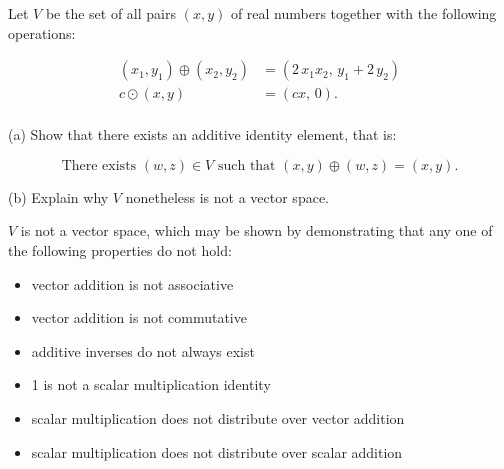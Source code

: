 
\begin{exerciseStatement}


 Let \(V\) be the set of all pairs \((x,y)\) of real numbers together with the following operations: 


\begin{align*} (x_1,y_1)\oplus (x_2,y_2)&= \left(2 \, x_{1} x_{2},\,y_{1} + 2 \, y_{2}\right)  \\c \odot (x,y) &= \left(c x,\,0\right) . \\ \end{align*}
            

 (a) Show that there exists an additive identity element, that is: 

\[\text{There exists }(w,z)\in V\text{ such that }(x,y)\oplus(w,z)=(x,y).
    \]

 (b) Explain why \(V\) nonetheless is not a vector space. 


\end{exerciseStatement}
    
\begin{exerciseAnswer} 


\(V\) is not a vector space, which may be shown by demonstrating that any one of the following properties do not hold: 


\begin{itemize}
\item vector addition is not associative
\item vector addition is not commutative
\item additive inverses do not always exist
\item 1 is not a scalar multiplication identity
\item scalar multiplication does not distribute over vector addition
\item scalar multiplication does not distribute over scalar addition
\end{itemize}
    
\end{exerciseAnswer}
    
